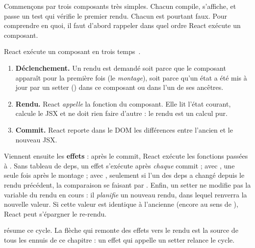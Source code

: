 Commençons par trois composants très simples. Chacun compile, s'affiche, et
passe un test qui vérifie le premier rendu. Chacun est pourtant faux. Pour
comprendre en quoi, il faut d'abord rappeler dans quel ordre React exécute un
composant.

\begin{react}
  React exécute un composant en trois temps~\cite{ReactRenderCommit}.
  \begin{enumerate}
    \item \textbf{Déclenchement.} Un rendu est demandé soit parce que le
      composant apparaît pour la première fois (le \emph{montage}), soit parce
      qu'un état a été mis à jour par un setter () dans ce
      composant ou dans l'un de ses ancêtres.
    \item \textbf{Rendu.} React \emph{appelle} la fonction du composant. Elle
      lit l'état courant, calcule le JSX et ne doit rien faire d'autre : le
      rendu est un calcul pur.
    \item \textbf{Commit.} React reporte dans le DOM les différences entre
      l'ancien et le nouveau JSX.
  \end{enumerate}
  Viennent ensuite les \textbf{effets} : après le commit, React exécute les
  fonctions passées à . Sans tableau de deps, un effet
  s'exécute après \emph{chaque} commit ; avec \code{[]}, une seule fois après
  le montage ; avec \code{[a, b]}, seulement si l'un des deps a changé depuis
  le rendu précédent, la comparaison se faisant par . Enfin,
  un setter ne modifie pas la variable du rendu en cours : il \emph{planifie}
  un nouveau rendu, dans lequel  renverra la nouvelle valeur.
  Si cette valeur est identique à l'ancienne (encore au sens de
  ), React peut s'épargner le re-rendu.
\end{react}

 résume ce cycle. La flèche qui remonte des
effets vers le rendu est la source de tous les ennuis de ce chapitre : un effet
qui appelle un setter relance le cycle.

